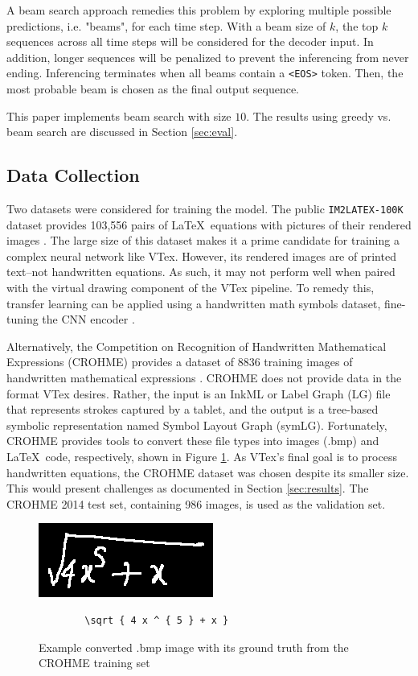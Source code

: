 A beam search approach remedies this problem by exploring multiple possible predictions, i.e. "beams", for each time step. With a beam size of $k$, the top $k$ sequences across all time steps will be considered for the decoder input. In addition, longer sequences will be penalized to prevent the inferencing from never ending. Inferencing terminates when all beams contain a {\tt <EOS>} token. Then, the most probable beam is chosen as the final output sequence.

This paper implements beam search with size $10$. The results using greedy vs. beam search are discussed in Section \ref{sec:eval}. 


\subsection{Data Collection} \label{sec:datacollection}
Two datasets were considered for training the model. The public {\tt IM2LATEX-100K} dataset provides 103,556 pairs of \LaTeX\ equations with pictures of their rendered images \cite{im2latex}. The large size of this dataset makes it a prime candidate for training a complex neural network like VTex. However, its rendered images are of printed text--not handwritten equations. As such, it may not perform well when paired with the virtual drawing component of the VTex pipeline. To remedy this, transfer learning can be applied using a handwritten math symbols dataset, fine-tuning the CNN encoder \cite{HandwrittenMath}.

Alternatively, the Competition on Recognition of Handwritten Mathematical Expressions (CROHME) provides a dataset of 8836 training images of handwritten mathematical expressions \cite{CROHME}. CROHME does not provide data in the format VTex desires. Rather, the input is an InkML or Label Graph (LG) file that represents strokes captured by a tablet, and the output is a tree-based symbolic representation named Symbol Layout Graph (symLG). Fortunately, CROHME provides tools to convert these file types into images (.bmp) and \LaTeX\ code, respectively, shown in Figure \ref{fig:datasample}. As VTex's final goal is to process handwritten equations, the CROHME dataset was chosen despite its smaller size. This would present challenges as documented in Section \ref{sec:results}. The CROHME 2014 test set, containing 986 images, is used as the validation set.

\begin{figure}[h!]
    \centering
    \includegraphics{images/20_em_40.png}
    \begin{verbatim}
        \sqrt { 4 x ^ { 5 } + x }
    \end{verbatim}
    \caption{Example converted .bmp image with its ground truth from the CROHME training set}
    \label{fig:datasample}
\end{figure}


